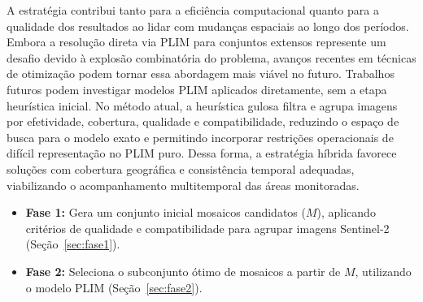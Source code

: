 \documentclass[a4paper,11pt]{article}
\begin{document}
A estratégia contribui tanto para a eficiência computacional quanto para a qualidade dos resultados ao lidar com mudanças espaciais ao longo dos períodos. Embora a resolução direta via PLIM para conjuntos extensos represente um desafio devido à explosão combinatória do problema, avanços recentes em técnicas de otimização podem tornar essa abordagem mais viável no futuro. Trabalhos futuros podem investigar modelos PLIM aplicados diretamente, sem a etapa heurística inicial. No método atual, a heurística gulosa filtra e agrupa imagens por efetividade, cobertura, qualidade e compatibilidade, reduzindo o espaço de busca para o modelo exato e permitindo incorporar restrições operacionais de difícil representação no PLIM puro. Dessa forma, a estratégia híbrida favorece soluções com cobertura geográfica e consistência temporal adequadas, viabilizando o acompanhamento multitemporal das áreas monitoradas.
\vspace{-5mm}

\begin{itemize}
    \item \textbf{Fase 1:}%
    Gera um conjunto inicial mosaicos candidatos ($M$), aplicando critérios de qualidade e compatibilidade para agrupar imagens Sentinel-2 (Seção~\ref{sec:fase1}).
    \vspace{-1mm}
    \item \textbf{Fase 2:}%
    Seleciona o subconjunto ótimo de mosaicos a partir de $M$, utilizando o modelo PLIM (Seção~\ref{sec:fase2}).
\end{itemize}

\vspace{-10mm}
\end{document}
